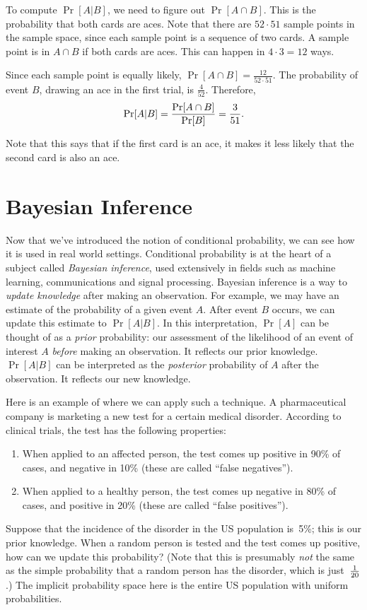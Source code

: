 \documentclass[11pt]{article}
\begin{document}
To compute $\Pr[A\vert B]$, we need to figure out $\Pr[A\cap B]$.  
This is the probability that both cards are aces. Note that there are 
$52\cdot 51$ sample points in the sample space, since each sample 
point is a sequence of two cards. A sample point is in $A\cap B$ if both
cards are aces. This can happen in $4\cdot 3 = 12$ ways. 

Since each sample point is equally likely, $\Pr[A\cap B] = \frac{12}{52\cdot 51}$. 
The probability of event $B$, drawing an ace in the first trial, is $\frac{4}{52}$. 
Therefore, $$\Pr[A\vert B] = {{\Pr[A\cap B]}\over{\Pr[B]}} = {3\over 51}.
 $$
 
 Note that this says that if the first card is an ace, it makes it less likely that
 the second card is also an ace. 
 
 \section*{Bayesian Inference}
 Now that we've introduced the notion of conditional probability, we can see
 how it is used in real world settings. Conditional probability is at the heart
 of a subject called {\em
Bayesian inference}, used extensively in fields such as machine
learning, communications and signal processing. Bayesian inference
is a way to {\em update knowledge} after making an
observation. For example, we may have an estimate of the probability
of a given event $A$. After event $B$ occurs, we can update this estimate to $\Pr[A|B]$. 
In this interpretation, $\Pr [A]$ can be thought of as
a {\em prior} probability: our assessment of the likelihood of an
event of interest $A$  {\em before} making an observation. It
reflects our prior knowledge. $\Pr [A|B]$ can be interpreted as the
{\em posterior} probability of $A$ after the observation. It
reflects our new knowledge.

Here is an example of where we can apply such a technique. 
A pharmaceutical company is marketing a new test for a certain
medical disorder.  According to clinical trials, the test has
the following properties:
\begin{enumerate}
\item When applied to an affected person, the test comes up
positive in 90\% of cases, and negative in 10\% (these are
called ``false negatives'').
\item When applied to a healthy person, the test comes up
negative in 80\% of cases, and positive in 20\% (these are
called ``false positives'').
\end{enumerate}
Suppose that the incidence of the disorder in the US population
is~5\%; this is our prior knowledge. When a random person is tested and the test comes up
positive, how can we update this probability? (Note that this is presumably {\it not\/} the
same as the simple probability that a random person has the
disorder, which is just~$1\over{20}$.)  The implicit probability
space here is the entire US population with uniform probabilities.
\end{document}
